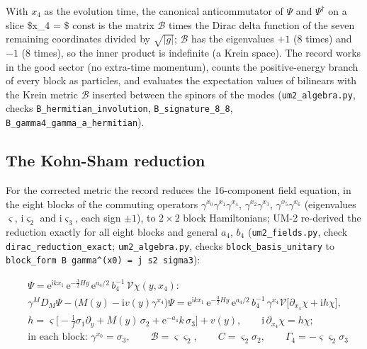 \documentclass[
  10pt,
]{article}
\begin{document}
With \(x_4\) as the evolution time, the canonical anticommutator of
\(\Psi\) and \(\Psi^\dagger\) on a slice \$x\_4 = \$ const is the matrix
\(\mathcal{B}\) times the Dirac delta function of the seven remaining
coordinates divided by \(\sqrt{\lvert g\rvert}\); \(\mathcal{B}\) has
the eigenvalues \(+1\) (8 times) and \(-1\) (8 times), so the inner
product is indefinite (a Krein space). The record works in the good
sector (no extra-time momentum), counts the positive-energy branch of
every block as particles, and evaluates the expectation values of
bilinears with the Krein metric \(\mathcal{B}\) inserted between the
spinors of the modes (\texttt{um2\_algebra.py}, checks
\texttt{B\_hermitian\_involution}, \texttt{B\_signature\_8\_8},
\texttt{B\_gamma4\_gamma\_a\_hermitian}).

\hypertarget{the-kohn-sham-reduction}{%
\subsection{The Kohn-Sham reduction}\label{the-kohn-sham-reduction}}

For the corrected metric the record reduces the 16-component field
equation, in the eight blocks of the commuting operators
\(\gamma^{x_0}\gamma^{x_1}\gamma^{x_4}\), \(\gamma^{x_2}\gamma^{x_3}\),
\(\gamma^{x_5}\gamma^{x_6}\) (eigenvalues \(\varsigma\),
\(\mathrm{i}\varsigma_2\) and \(\mathrm{i}\varsigma_3\), each sign
\(\pm1\)), to \(2\times2\) block Hamiltonians; UM-2 re-derived the
reduction exactly for all eight blocks and general \(a_4\), \(b_4\)
(\texttt{um2\_fields.py}, check \texttt{dirac\_reduction\_exact};
\texttt{um2\_algebra.py}, checks \texttt{block\_basis\_unitary} to
\texttt{block\_form\ B\ gamma\^{}(x0)\ =\ j\ s2\ sigma3}):

\[
\begin{aligned}
&\Psi = \mathrm{e}^{\mathrm{i}kx_1}\,\mathrm{e}^{-\frac32Hy}\,\mathrm{e}^{a_4/2}\,b_4^{-1}\,\mathcal{V}
 \chi(y, x_4):\\
&\gamma^MD_M\Psi - \big(M(y) - \mathrm{i}v(y)\gamma^{x_4}\big)\Psi
 = \mathrm{e}^{\mathrm{i}kx_1}\,\mathrm{e}^{-\frac32Hy}\,\mathrm{e}^{a_4/2}\,b_4^{-1}\,\gamma^{x_4}\mathcal{V}
 \big[\partial_{x_4}\chi + \mathrm{i}h\chi\big],\\
&h = \varsigma\Big[-\frac{\mathrm{i}}{f}\sigma_1\partial_y + M(y)\,\sigma_2 +
 \mathrm{e}^{-a_4}k\,\sigma_3\Big] + v(y),\qquad
 \mathrm{i}\,\partial_{x_4}\chi = h\chi;\\
&\text{in each block: }\gamma^{x_0} = \sigma_3,\qquad \mathcal{B} = \varsigma\varsigma_2,\qquad
 C = \varsigma_2\sigma_2,\qquad \Gamma_4 = -\varsigma\varsigma_2\sigma_3
\end{aligned} \tag{FE-56}
\]
\end{document}
